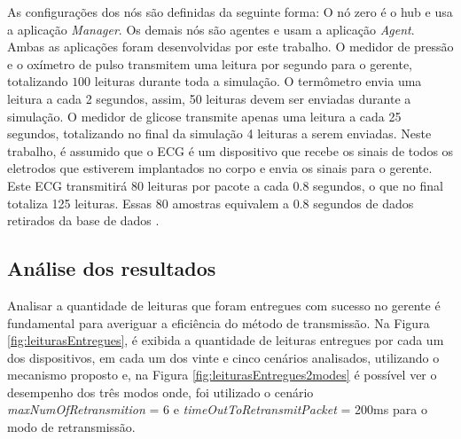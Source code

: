 As configurações dos nós são definidas da seguinte forma: O nó zero é o hub e usa a aplicação \textit{Manager}. Os demais nós são agentes e usam a aplicação \textit{Agent}. Ambas as aplicações foram desenvolvidas por este trabalho. O medidor de pressão e o oxímetro de pulso transmitem uma leitura por segundo para o gerente, totalizando $100$ leituras durante toda a simulação. O termômetro envia uma leitura a cada 2 segundos, assim, 50 leituras devem ser enviadas durante a simulação. O medidor de glicose transmite apenas uma leitura a cada 25 segundos, totalizando no final da simulação 4 leituras a serem enviadas. Neste trabalho, é assumido que o ECG é um dispositivo que recebe os sinais de todos os eletrodos que estiverem implantados no corpo e envia os sinais para o gerente. Este ECG transmitirá $80$ leituras por pacote a cada $0.8$ segundos, o que no final totaliza 125 leituras. Essas $80$ amostras equivalem a $0.8$ segundos de dados retirados da base de dados \cite{b2}.

\subsection{Análise dos resultados}


Analisar a quantidade de leituras que foram entregues com sucesso no gerente é fundamental para averiguar a eficiência do método de transmissão. Na Figura \ref{fig:leiturasEntregues}, é exibida a quantidade de leituras entregues por cada um dos dispositivos, em cada um dos vinte e cinco cenários analisados, utilizando o mecanismo proposto e, na Figura \ref{fig:leiturasEntregues2modes} é possível ver o desempenho dos três modos onde, foi utilizado o cenário \textit{maxNumOfRetransmition} = 6 e \textit{timeOutToRetransmitPacket} = 200ms para o modo de retransmissão. 

